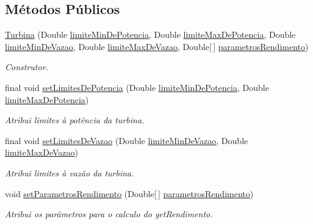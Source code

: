 \subsection*{Métodos Públicos}
\begin{DoxyCompactItemize}
\item 
\hyperlink{classusina_1_1_turbina_abd3ec63d990bd3598954031d6daffabc}{Turbina} (Double \hyperlink{classusina_1_1_turbina_a9d422881e2943b12a26cb27caf92d08b}{limite\-Min\-De\-Potencia}, Double \hyperlink{classusina_1_1_turbina_ab6648bca34b30eedf9f9246fe7bfde00}{limite\-Max\-De\-Potencia}, Double \hyperlink{classusina_1_1_turbina_a549b44e83d93c34fc79bdeb688c60b7d}{limite\-Min\-De\-Vazao}, Double \hyperlink{classusina_1_1_turbina_a0f961379b5f4e4779f98d15dd093c6ba}{limite\-Max\-De\-Vazao}, Double\mbox{[}$\,$\mbox{]} \hyperlink{classusina_1_1_turbina_a5787dbae79e4108296573fd4dbf156da}{parametros\-Rendimento})
\begin{DoxyCompactList}\small\item\em Construtor. \end{DoxyCompactList}\item 
final void \hyperlink{classusina_1_1_turbina_af3c11239f2309b85267bdc60580bd9a8}{set\-Limites\-De\-Potencia} (Double \hyperlink{classusina_1_1_turbina_a9d422881e2943b12a26cb27caf92d08b}{limite\-Min\-De\-Potencia}, Double \hyperlink{classusina_1_1_turbina_ab6648bca34b30eedf9f9246fe7bfde00}{limite\-Max\-De\-Potencia})
\begin{DoxyCompactList}\small\item\em Atribui limites à potência da turbina. \end{DoxyCompactList}\item 
final void \hyperlink{classusina_1_1_turbina_a7b96c0bc6e3eff9430d79d287645c306}{set\-Limites\-De\-Vazao} (Double \hyperlink{classusina_1_1_turbina_a549b44e83d93c34fc79bdeb688c60b7d}{limite\-Min\-De\-Vazao}, Double \hyperlink{classusina_1_1_turbina_a0f961379b5f4e4779f98d15dd093c6ba}{limite\-Max\-De\-Vazao})
\begin{DoxyCompactList}\small\item\em Atribui limites à vazão da turbina. \end{DoxyCompactList}\item 
void \hyperlink{classusina_1_1_turbina_abc98fbb1a34b3d911b791e6a19f9c784}{set\-Parametros\-Rendimento} (Double\mbox{[}$\,$\mbox{]} \hyperlink{classusina_1_1_turbina_a5787dbae79e4108296573fd4dbf156da}{parametros\-Rendimento})
\begin{DoxyCompactList}\small\item\em Atribui os parâmetros para o calculo do get\-Rendimento. \end{DoxyCompactList}\item 

\end{DoxyCompactItemize}
